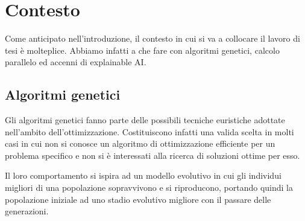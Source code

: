 \chapter{Contesto}\label{cap: contesto}

Come anticipato nell'introduzione, il contesto in cui si va a collocare il
lavoro di tesi è molteplice. Abbiamo infatti a che fare con algoritmi genetici,
calcolo parallelo ed accenni di explainable AI.

\section{Algoritmi genetici}

Gli algoritmi genetici fanno parte delle possibili tecniche euristiche adottate
nell'ambito dell'ottimizzazione. Costituiscono infatti una valida scelta in
molti casi in cui non si conosce un algoritmo di ottimizzazione efficiente per
un problema specifico e non si è interessati alla ricerca di soluzioni ottime
per esso.

Il loro comportamento si ispira ad un modello evolutivo in cui gli individui
migliori di una popolazione sopravvivono e si riproducono, portando quindi la
popolazione iniziale ad uno stadio evolutivo migliore con il passare delle
generazioni.

